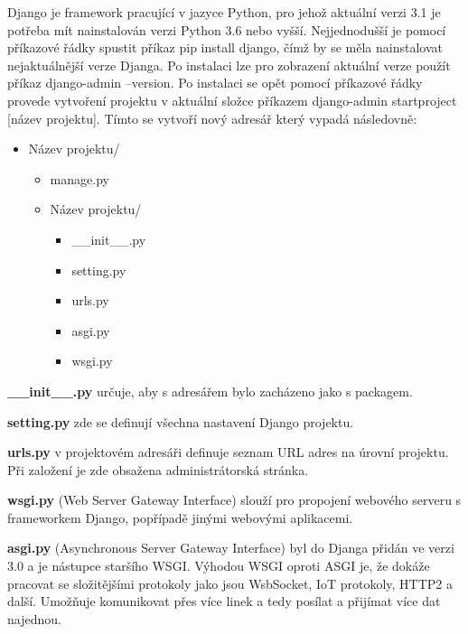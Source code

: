 Django je framework pracující v jazyce Python, pro jehož aktuální
verzi 3.1 je potřeba mít nainstalován verzi Python 3.6 nebo
vyšší. Nejjednodušší je pomocí příkazové řádky spustit příkaz pip
install django, čímž by se měla nainstalovat nejaktuálnější verze
Djanga. Po instalaci lze pro zobrazení aktuální verze použít příkaz
django-admin --version. Po instalaci se opět pomocí příkazové řádky
provede vytvoření projektu v aktuální složce příkazem django-admin
startproject [název projektu]. Tímto se vytvoří nový adresář který
vypadá následovně:

\begin{itemize}
	\item \lbrack Název projektu\rbrack /
	\begin{itemize}
		\item manage.py
		\item \lbrack Název projektu\rbrack /
		\begin{itemize}
			\item \_\_init\_\_.py
			\item setting.py
			\item urls.py
			\item asgi.py
			\item wsgi.py
		\end{itemize}
	\end{itemize}
\end{itemize}

\vspace{6px}

\textbf{\_\_init\_\_.py} určuje, aby s adresářem bylo zacházeno jako s packagem.
\vspace{6px}

\textbf{setting.py} zde se definují všechna nastavení Django projektu. 
\vspace{6px}

\textbf{urls.py} v projektovém adresáři definuje seznam URL adres na
úrovní projektu. Při založení je zde obsažena administrátorská
stránka.  \vspace{6px}

\textbf{wsgi.py} (Web Server Gateway Interface) slouží pro propojení
webového serveru s frameworkem Django, popřípadě jinými webovými
aplikacemi.  \vspace{6px}

\textbf{asgi.py} (Asynchronous Server Gateway Interface) byl do Djanga
přidán ve verzi 3.0 a je nástupce staršího WSGI. Výhodou WSGI oproti
ASGI je, že dokáže pracovat se složitějšími protokoly jako jsou
WsbSocket, IoT protokoly, HTTP2 a další. Umožňuje komunikovat přes
více linek a tedy posílat a přijímat více dat najednou.  \vspace{6px}

